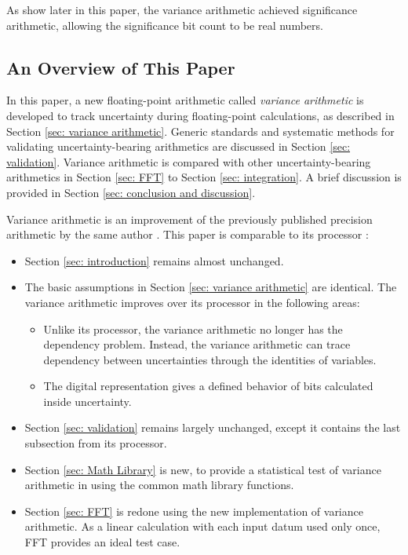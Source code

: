\documentclass[twoside]{article}
\numberwithin{equation}{section}
\begin{document}
As show later in this paper, the variance arithmetic achieved significance arithmetic, allowing the significance bit count to be real numbers.



\subsection{ An Overview of This Paper}

In this paper, a new floating-point arithmetic called \emph{variance arithmetic} is developed to track uncertainty during floating-point calculations, as described in Section \ref{sec: variance arithmetic}.  
Generic standards and systematic methods for validating uncertainty-bearing arithmetics are discussed in Section \ref{sec: validation}.  
Variance arithmetic is compared with other uncertainty-bearing arithmetics in Section \ref{sec: FFT} to Section \ref{sec: integration}.  A brief discussion is provided in Section \ref{sec: conclusion and discussion}.

Variance arithmetic is an improvement of the previously published precision arithmetic by the same author \cite{Prev_Precision_Arithmetic}.
This paper is comparable to its processor \cite{Prev_Precision_Arithmetic}:
\begin{itemize}
\item Section \ref{sec: introduction} remains almost unchanged.

\item The basic assumptions in Section \ref{sec: variance arithmetic} are identical.
The variance arithmetic improves over its processor in the following areas:
\begin{itemize}
\item Unlike its processor, the variance arithmetic no longer has the dependency problem.
Instead, the variance arithmetic can trace dependency between uncertainties through the identities of variables.

\item The digital representation gives a defined behavior of bits calculated inside uncertainty. 
\end{itemize}

\item Section \ref{sec: validation} remains largely unchanged, except it contains the last subsection from its processor.

\item Section \ref{sec: Math Library} is new, to provide a statistical test of variance arithmetic in using the common math library functions.

\item Section \ref{sec: FFT} is redone using the new implementation of variance arithmetic.  
As a linear calculation with each input datum used only once, FFT provides an ideal test case.

\end{itemize}
\end{document}
